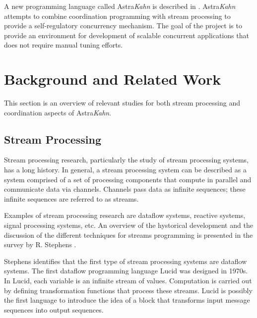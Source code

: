\documentclass{article}
\begin{document}
A new programming language called Astra\emph{Kahn} is described in \cite{astrakahn}. Astra\emph{Kahn} attempts to combine coordination programming with stream processing to provide a self-regulatory concurrency mechanism. The goal of the project is to provide an environment for development of scalable concurrent applications that does not require manual tuning efforts.

\section{Background and Related Work}
This section is an overview of relevant studies for both stream processing and coordination aspects of Astra\emph{Kahn}.

\subsection{Stream Processing}
Stream processing research, particularly the study of stream processing systems, has a long history. In general, a stream processing system can be described as a system comprised of a set of processing components that compute in parallel and communicate data via channels. Channels pass data as infinite sequences; these infinite sequences are referred to as streams.

Examples of stream processing research are dataflow systems, reactive systems, signal processing systems, etc. An overview of the hystorical development and the discussion of the different techniques for streams programming is presented in the survey by R. Stephens \cite{stephens97}.

Stephens identifies that the first type of stream processing systems are dataflow systems. The first dataflow programming language Lucid \cite{lucid} was designed in 1970s. In Lucid, each variable is an infinite stream of values. Computation is carried out by defining transformation functions that process these streams. Lucid is possibly the first language to introduce the idea of a block that transforms input message sequences into output sequences.
\end{document}
